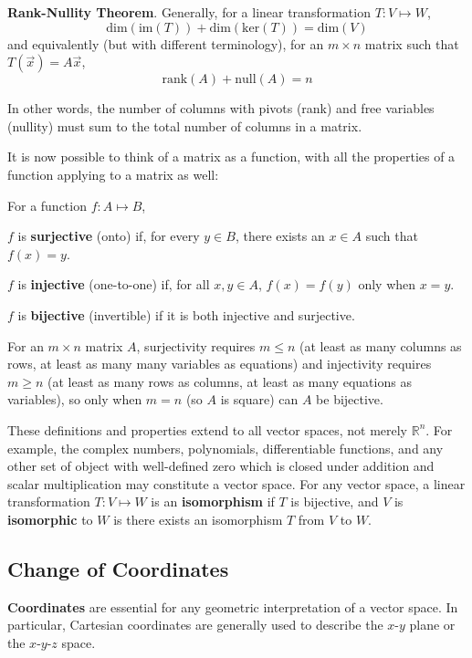 \begin{shaded}
    \textbf{Rank-Nullity Theorem}. Generally, for a linear transformation $T:V\mapsto W$,
    \[\text{dim}(\text{im}(T)) + \text{dim}(\text{ker}(T)) = \text{dim}(V)\] and equivalently (but with different terminology), for an $m\times n$ matrix such that $T(\vec{x}) = A\vec{x}$, 
    \[\text{rank}(A) + \text{null}(A) = n\]
\end{shaded}

In other words, the number of columns with pivots (rank) and free variables (nullity) must sum to the total number of columns in a matrix.

It is now possible to think of a matrix as a function, with all the properties of a function applying to a matrix as well:

\begin{shaded}
For a function $f:A\mapsto B$,

$f$ is \textbf{surjective} (onto) if, for every $y\in B$, there exists an $x\in A$ such that $f(x)=y$.

$f$ is \textbf{injective} (one-to-one) if, for all $x,y\in A$, $f(x)=f(y)$ only when $x=y$.

$f$ is \textbf{bijective} (invertible) if it is both injective and surjective.
\end{shaded}

For an $m\times n$ matrix $A$, surjectivity requires $m \leq n$ (at least as many columns as rows, at least as many many variables as equations) and injectivity requires $m\geq n$ (at least as many rows as columns, at least as many equations as variables), so only when $m=n$ (so $A$ is square) can $A$ be bijective.

These definitions and properties extend to all vector spaces, not merely $\mathbb{R}^n$. For example, the complex numbers, polynomials, differentiable functions, and any other set of object with well-defined zero which is closed under addition and scalar multiplication may constitute a vector space. For any vector space, a linear transformation $T:V\mapsto W$ is an \textbf{isomorphism} if $T$ is bijective, and $V$ is \textbf{isomorphic} to $W$ is there exists an isomorphism $T$ from $V$ to $W$.


\subsection{Change of Coordinates}

\textbf{Coordinates} are essential for any geometric interpretation of a vector space. In particular, Cartesian coordinates are generally used to describe the $x$-$y$ plane or the $x$-$y$-$z$ space.

